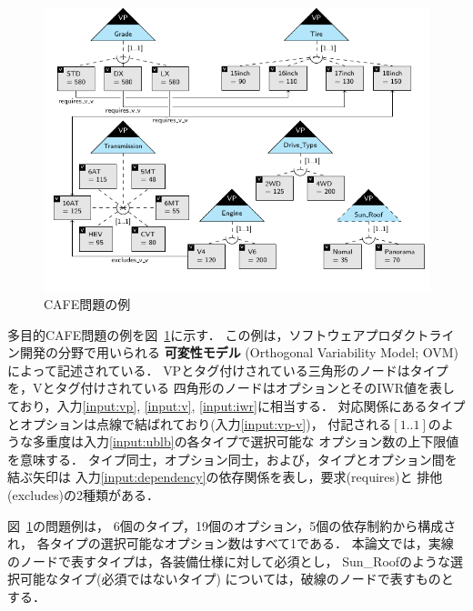 \begin{figure}[t]
  \centering
  \includegraphics[width=1.1\linewidth]{images/ovm_example.pdf}
  \caption{CAFE問題の例}
  \label{fig:ovm_example}
\end{figure}

多目的CAFE問題の例を図~\ref{fig:ovm_example}に示す．
この例は，ソフトウェアプロダクトライン開発の分野で用いられる
\textbf{可変性モデル} (Orthogonal Variability Model; OVM\cite{Pohl05:sple})
によって記述されている．
{\sf VP}とタグ付けされている三角形のノードはタイプを，{\sf V}とタグ付けされている
四角形のノードはオプションとそのIWR値を表しており，入力\ref{input:vp}, 
\ref{input:v}, \ref{input:iwr}に相当する．
対応関係にあるタイプとオプションは点線で結ばれており(入力\ref{input:vp-v})，
付記される$[1..1]$のような多重度は入力\ref{input:ublb}の各タイプで選択可能な
オプション数の上下限値を意味する．
タイプ同士，オプション同士，および，タイプとオプション間を結ぶ矢印は
入力\ref{input:dependency}の依存関係を表し，要求(requires)と
排他(excludes)の2種類がある．

図~\ref{fig:ovm_example}の問題例は，
6個のタイプ，19個のオプション，5個の依存制約から構成され，
各タイプの選択可能なオプション数はすべて1である．
本論文では，実線のノードで表すタイプは，各装備仕様に対して必須とし，
\textsf{Sun\_Roof}のような選択可能なタイプ(必須ではないタイプ)
については，破線のノードで表すものとする．



